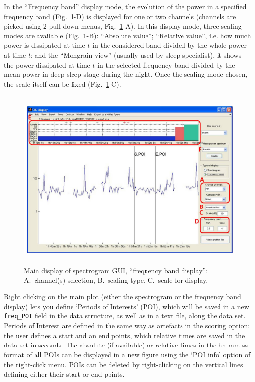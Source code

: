 \documentclass[a4paper,titlepage]{article}
\begin{document}
In the ``Frequency band'' display mode, the evolution of the power in a specified frequency band (Fig.~\ref{fig:TB_disfrq2}-D) is displayed for one or two channels (channels are picked using 2 pull-down menus, Fig.~\ref{fig:TB_disfrq2}-A). In this display mode, three scaling modes are available (Fig.~\ref{fig:TB_disfrq2}-B): ``Absolute value''; ``Relative value'', i.e. how much power is dissipated at time $t$ in the considered band divided by the whole power at time $t$; and the ``Mongrain view'' (usually used by sleep specialist), it shows the power dissipated at time $t$ in the selected frequency band divided by the mean power in deep sleep stage during the night. Once the scaling mode chosen, the scale itself can be fixed (Fig.~\ref{fig:TB_disfrq2}-C).
\begin{figure}[ht]
	\centering
		\includegraphics[width=15cm,height=9cm]{images/FIG8_disfreq_fband.jpg}
	\caption{Main display of spectrogram GUI, ``frequency band display'': A.~channel(s) selection, B.~scaling type, C.~scale for display.
	\label{fig:TB_disfrq2}}
\end{figure}

Right clicking on the main plot (either the spectrogram or the frequency band display) lets you define `Periods of Interests' (POI), which will be saved in a new {\tt freq\_POI} field in the data structure, as well as in a text file, along the data set. Periods of Interest are defined in the same way as artefacts in the scoring option: the user defines a start and an end points, which relative times are saved in the data set in seconds. The absolute (if available) or relative times in the hh-mm-ss format of all POIs can be displayed in a new figure using the `POI info' option of the right-click menu. POIs can be deleted by right-clicking on the vertical lines defining either their start or end points.
\end{document}
